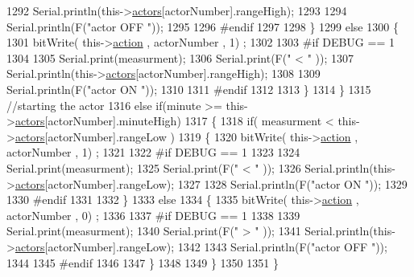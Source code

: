 \begin{DoxyCode}
1292                 Serial.println(this->\hyperlink{class_jetpack_a7e16d2f97837f9712a2e6de1c50d99db}{actors}[actorNumber].rangeHigh);
1293 
1294                 Serial.println(F(\textcolor{stringliteral}{"actor OFF "}));
1295 
1296 \textcolor{preprocessor}{            #endif}
1297     
1298             \}
1299             \textcolor{keywordflow}{else} 
1300             \{
1301                 bitWrite( this->\hyperlink{class_jetpack_aca3142925a7b0834b34ae91d26af7765}{action} , actorNumber , 1) ;
1302 
1303 \textcolor{preprocessor}{            #if DEBUG == 1 }
1304 
1305                 Serial.print(measurment);
1306                 Serial.print(F(\textcolor{stringliteral}{" < "} ));
1307                 Serial.println(this->\hyperlink{class_jetpack_a7e16d2f97837f9712a2e6de1c50d99db}{actors}[actorNumber].rangeHigh);
1308 
1309                 Serial.println(F(\textcolor{stringliteral}{"actor ON "}));
1310 
1311 \textcolor{preprocessor}{            #endif  }
1312                 
1313             \}
1314     \}   
1315     \textcolor{comment}{//starting the actor}
1316     \textcolor{keywordflow}{else} \textcolor{keywordflow}{if}(minute >= this->\hyperlink{class_jetpack_a7e16d2f97837f9712a2e6de1c50d99db}{actors}[actorNumber].minuteHigh)
1317     \{
1318             \textcolor{keywordflow}{if}( measurment < this->\hyperlink{class_jetpack_a7e16d2f97837f9712a2e6de1c50d99db}{actors}[actorNumber].rangeLow )
1319             \{
1320                 bitWrite( this->\hyperlink{class_jetpack_aca3142925a7b0834b34ae91d26af7765}{action} , actorNumber , 1) ;
1321 
1322 \textcolor{preprocessor}{            #if DEBUG == 1 }
1323 
1324                 Serial.print(measurment);
1325                 Serial.print(F(\textcolor{stringliteral}{" < "} ));
1326                 Serial.println(this->\hyperlink{class_jetpack_a7e16d2f97837f9712a2e6de1c50d99db}{actors}[actorNumber].rangeLow);
1327 
1328                 Serial.println(F(\textcolor{stringliteral}{"actor ON "}));
1329 
1330 \textcolor{preprocessor}{            #endif  }
1331 
1332             \}
1333             \textcolor{keywordflow}{else} 
1334             \{
1335                 bitWrite( this->\hyperlink{class_jetpack_aca3142925a7b0834b34ae91d26af7765}{action} , actorNumber , 0) ;
1336             
1337 \textcolor{preprocessor}{            #if DEBUG == 1 }
1338 
1339                 Serial.print(measurment);
1340                 Serial.print(F(\textcolor{stringliteral}{" > "} ));
1341                 Serial.println(this->\hyperlink{class_jetpack_a7e16d2f97837f9712a2e6de1c50d99db}{actors}[actorNumber].rangeLow);
1342 
1343                 Serial.println(F(\textcolor{stringliteral}{"actor OFF "}));
1344 
1345 \textcolor{preprocessor}{            #endif  }
1346                 
1347             \}
1348 
1349     \}
1350 
1351 \}
\end{DoxyCode}
